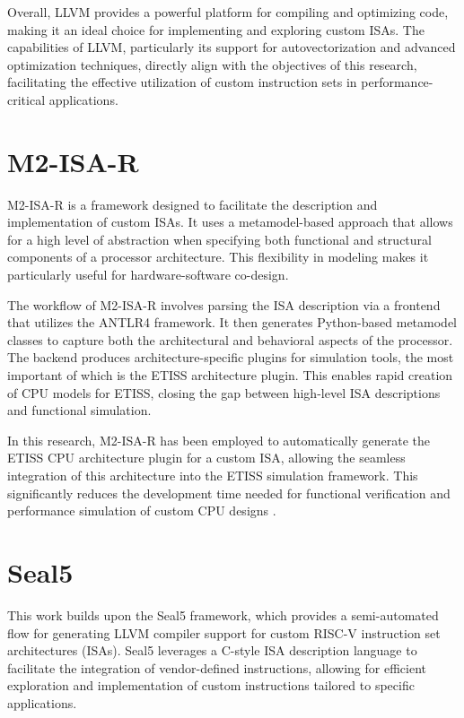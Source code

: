 Overall, LLVM provides a powerful platform for compiling and optimizing code, making it an ideal choice for implementing and exploring custom ISAs. The capabilities of LLVM, particularly its support for autovectorization and advanced optimization techniques, directly align with the objectives of this research, facilitating the effective utilization of custom instruction sets in performance-critical applications.


\section{M2-ISA-R}
M2-ISA-R is a framework designed to facilitate the description and implementation of custom ISAs. It uses a metamodel-based approach that allows for a high level of abstraction when specifying both functional and structural components of a processor architecture. This flexibility in modeling makes it particularly useful for hardware-software co-design.

The workflow of M2-ISA-R involves parsing the ISA description via a frontend that utilizes the ANTLR4 framework. It then generates Python-based metamodel classes to capture both the architectural and behavioral aspects of the processor. The backend produces architecture-specific plugins for simulation tools, the most important of which is the ETISS architecture plugin. This enables rapid creation of CPU models for ETISS, closing the gap between high-level ISA descriptions and functional simulation.

In this research, M2-ISA-R has been employed to automatically generate the ETISS CPU architecture plugin for a custom ISA, allowing the seamless integration of this architecture into the ETISS simulation framework. This significantly reduces the development time needed for functional verification and performance simulation of custom CPU designs \cite{RISCVSimulation}.

\section{Seal5}

This work builds upon the Seal5 framework, which provides a semi-automated flow for generating LLVM compiler support for custom RISC-V instruction set architectures (ISAs). Seal5 leverages a C-style ISA description language to facilitate the integration of vendor-defined instructions, allowing for efficient exploration and implementation of custom instructions tailored to specific applications.

